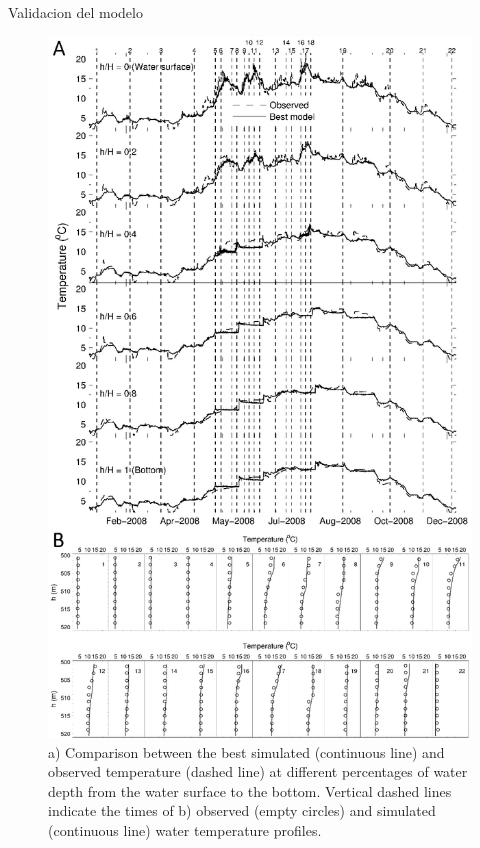 \documentclass[
10pt,
aspectratio=169,
]{beamer}
\begin{document}
\begin{frame}{Validacion del modelo}
\vspace{-0.2cm}
\begin{figure}[!htbp]
  \begin{center}
      \includegraphics[height=0.74\textheight]{profiAllNewBoth}
    \caption{\tiny a) Comparison between the best simulated (continuous line) and observed temperature (dashed line) at different percentages of water depth from the water surface to the bottom. Vertical dashed lines indicate the times of b) observed (empty circles) and simulated (continuous line) water temperature profiles.}
    \label{profiAll1}
  \end{center}
\end{figure}
\end{frame}
\end{document}
